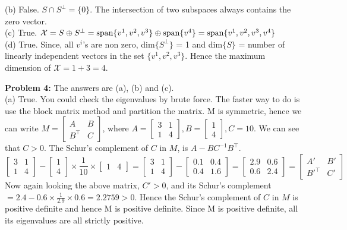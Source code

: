 \documentclass[letterpaper]{article}
\begin{document}
(b) False. $S \cap S^\perp = \{0\}$. The intersection of two subspaces always contains the zero vector.\\

(c) True. $\mathcal X = S \oplus S^\perp = \textrm{span} \{ v^1, v^2, v^3 \} \oplus \textrm{span} \{ v^4 \}= \textrm{span} \{ v^1, v^2, v^3, v^4 \} $\\

(d) True. Since, all $v^i$'s are non zero, dim$\{S^\perp\}$ = 1 and dim$\{S\}$ = number of linearly independent vectors in the set $\{v^1,v^2,v^3\}$. Hence the maximum dimension of $\mathcal X =  1 + 3 =4$.



\bigskip
\vspace{1cm}


\noindent \textbf{Problem 4:} The answers are (a), (b) and (c). \\

(a) True. You could check the eigenvalues by brute force. The faster way to do is use the block matrix method and partition the matrix. M is symmetric, hence we can write $M= \begin{bmatrix} A & B \\ B^\top & C\end{bmatrix}$, where $A=\begin{bmatrix} 3 & 1 \\ 1 & 4\end{bmatrix}, B = \begin{bmatrix}  1 \\ 4\end{bmatrix}, C = 10 $. We can see that $C>0$. The Schur's complement of $C$ in $M$, is $A - BC^{-1}B^\top $.
$$\begin{bmatrix} 3 & 1 \\ 1 & 4\end{bmatrix} - \begin{bmatrix}  1 \\ 4\end{bmatrix} \times\frac{1}{10}\times \begin{bmatrix}  1 & 4\end{bmatrix} = \begin{bmatrix} 3 & 1 \\ 1 & 4\end{bmatrix} - \begin{bmatrix} 0.1 & 0.4 \\ 0.4 & 1.6\end{bmatrix} = \begin{bmatrix} 2.9 & 0.6 \\ 0.6 & 2.4\end{bmatrix}= \begin{bmatrix} A' & B' \\ B'^\top & C'\end{bmatrix}$$
Now again looking the above matrix, $C' > 0$, and its Schur's complement $= 2.4 - 0.6\times \frac{1}{2.9} \times 0.6= 2.2759 >0 $. Hence the Schur's complement of $C$ in $M$ is positive definite and hence M is positive definite. Since M is positive definite, all its eigenvalues are all strictly positive.
\\
\end{document}
